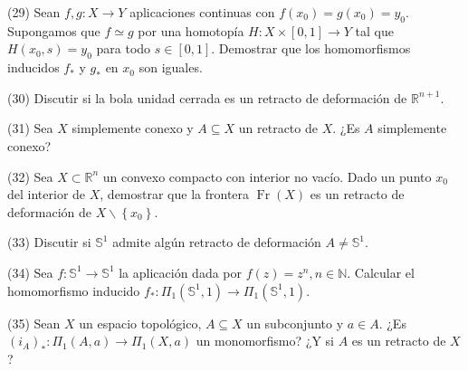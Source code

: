 \documentclass[
  a4paper,
  spanish,
  12pt,
]{scrartcl}
\begin{document}
\begin{ejer}
(29) Sean $f, g: X \rightarrow Y$ aplicaciones continuas con $f\left(x_{0}\right)=g\left(x_{0}\right)=y_{0}$. Supongamos que $f \simeq g$ por una homotopía $H: X \times[0,1] \rightarrow Y$ tal que $H\left(x_{0}, s\right)=y_{0}$ para todo $s \in[0,1]$. Demostrar que los homomorfismos inducidos $f_{*}$ y $g_{*}$ en $x_{0}$ son iguales.\\
\end{ejer}

\begin{ejer}
(30) Discutir si la bola unidad cerrada es un retracto de deformación de $\mathbb{R}^{n+1}$.\\
\end{ejer}

\begin{ejer}
(31) Sea $X$ simplemente conexo y $A \subseteq X$ un retracto de $X$. ¿Es $A$ simplemente conexo?\\
\end{ejer}

\begin{ejer}
(32) Sea $X \subset \mathbb{R}^{n}$ un convexo compacto con interior no vacío. Dado un punto $x_{0}$ del interior de $X$, demostrar que la frontera $\operatorname{Fr}(X)$ es un retracto de deformación de $X \backslash\left\{x_{0}\right\}$.\\
\end{ejer}

\begin{ejer}
(33) Discutir si $\mathbb{S}^{1}$ admite algún retracto de deformación $A \neq \mathbb{S}^{1}$.\\
\end{ejer}

\begin{ejer}
(34) Sea $f: \mathbb{S}^{1} \rightarrow \mathbb{S}^{1}$ la aplicación dada por $f(z)=z^{n}, n \in \mathbb{N}$. Calcular el homomorfismo inducido $f_{*}: \Pi_{1}\left(\mathbb{S}^{1}, 1\right) \rightarrow \Pi_{1}\left(\mathbb{S}^{1}, 1\right)$.\\
\end{ejer}

\begin{ejer}
(35) Sean $X$ un espacio topológico, $A \subseteq X$ un subconjunto y $a \in A$. ¿Es $\left(i_{A}\right)_{*}: \Pi_{1}(A, a) \rightarrow \Pi_{1}(X, a)$ un monomorfismo? ¿Y si $A$ es un retracto de $X$ ?\\
\end{ejer}
\end{document}
